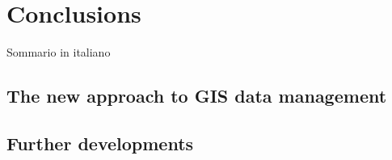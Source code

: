 \chapter{Conclusions}

    \begin{chaptersum}
        Sommario in italiano
    \end{chaptersum}

    \section{The new approach to GIS data management}
    \section{Further developments}
